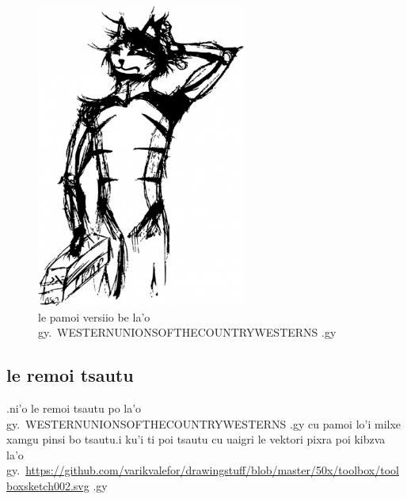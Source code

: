 \documentclass{report}
\newcommand\imageheight{10cm}
\begin{document}
\begin{figure}[ht]
	\centering
	\includegraphics[height=\imageheight]{50x/toolbox/s1v1.jpg}
	\caption[center]{le pamoi versiio be la'o gy.\ WESTERNUNIONSOFTHECOUNTRYWESTERNS .gy}
\end{figure}
\subsection{le remoi tsautu}
.ni'o le remoi tsautu po la'o gy.\ WESTERNUNIONSOFTHECOUNTRYWESTERNS .gy cu pamoi lo'i milxe xamgu pinsi bo tsautu\@  .i ku'i ti poi tsautu cu uaigri le vektori pixra poi kibzva la'o gy.\ \url{https://github.com/varikvalefor/drawingstuff/blob/master/50x/toolbox/toolboxsketch002.svg} .gy
\end{document}
